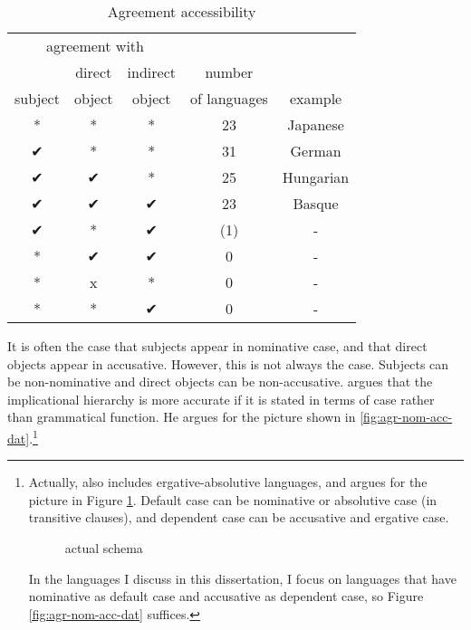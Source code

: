  \begin{table}[ht]
   \center
   \caption {Agreement accessibility}
     \begin{tabular}[t]{ccccc}
       \toprule
           \multicolumn{3}{c}{agreement with} &              &         \\
       \cmidrule{1-3}
                    & direct & indirect       & number       &         \\
           subject  & object & object         & of languages & example \\
       \cmidrule{1-3} \cmidrule{4-4} \cmidrule{5-5}
           *    & * & * & 23  & Japanese    \\
           ✔    & * & * & 31  & German     \\
           ✔    & ✔ & * & 25  & Hungarian  \\
           ✔    & ✔ & ✔ & 23  & Basque     \\
           ✔    & * & ✔ & (1) & -          \\
           {*}  & ✔ & ✔ & 0   & -          \\
           {*}  & x & * & 0   & -          \\
           {*}  & * & ✔ & 0   & -          \\
       \bottomrule
     \end{tabular}
     \label{tbl:agr-typo}
 \end{table}

It is often the case that subjects appear in nominative case, and that direct objects appear in accusative. However, this is not always the case. Subjects can be non-nominative and direct objects can be non-accusative. \citet{bobaljik2006} argues that the implicational hierarchy is more accurate if it is stated in terms of case rather than grammatical function. He argues for the picture shown in \ref{fig:agr-nom-acc-dat}.\footnote{
Actually, \citet{bobaljik2006} also includes ergative-absolutive languages, and argues for the picture in Figure \ref{fig:agr-def-dep-dat}. Default case can be nominative or absolutive case (in transitive clauses), and dependent case can be accusative and ergative case.

\begin{figure}[H]
  \centering
  \footnotesize{
  }
  \caption{\footnotesize{ actual schema}}
  \label{fig:agr-def-dep-dat}
\end{figure}

In the languages I discuss in this dissertation, I focus on languages that have nominative as default case and accusative as dependent case, so Figure \ref{fig:agr-nom-acc-dat} suffices.}

